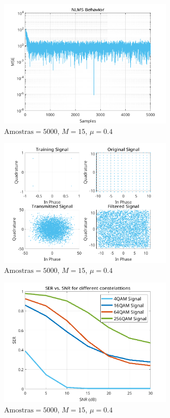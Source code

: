 \documentclass[a4paper,10pt]{article}
\begin{document}
\begin{enumerate}
				\begin{figure}[H]
					\centering
					\includegraphics[width=0.75\textwidth]{figs/L3Q6_C_mse.png}
					\caption{$\text{Amostras} = 5000$, $M = 15$, $\mu = 0.4$}
					\label{fig:L3Q6C1}
				\end{figure}

				\begin{figure}[H]
					\centering
					\includegraphics[width=0.75\textwidth]{figs/L3Q6_C_t.png}
					\caption{$\text{Amostras} = 5000$, $M = 15$, $\mu = 0.4$}
					\label{fig:L3Q6C2}
				\end{figure}

				\begin{figure}[H]
					\centering
					\includegraphics[width=0.75\textwidth]{figs/L3Q6_D_ser.png}
					\caption{$\text{Amostras} = 5000$, $M = 15$, $\mu = 0.4$}
					\label{fig:L3Q6D}
				\end{figure}

		\end{enumerate}
	
\end{document}
